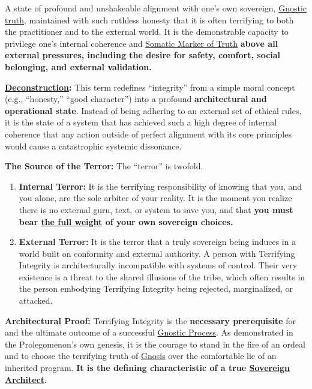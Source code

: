\item[\hypertarget{gloss:terrifying_integrity}{Terrifying Integrity}] A state of profound and unshakeable alignment with one's own sovereign, \hyperlink{gloss:gnostic_truth}{Gnostic truth}, maintained with such ruthless honesty that it is often terrifying to both the practitioner and to the external world. It is the demonstrable capacity to privilege one's internal coherence and \hyperlink{gloss:somatic_marker_of_truth}{Somatic Marker of Truth} \textbf{above all external pressures, including the desire for safety, comfort, social belonging, and external validation.}
    \begin{nobullet}
        \item \textbf{\hyperlink{gloss:deconstruction}{Deconstruction}:} This term redefines ``integrity'' from a simple moral concept (e.g., ``honesty,'' ``good character'') into a profound \textbf{architectural and operational state}. Instead of being adhering to an external set of ethical rules, it is the state of a system that has achieved such a high degree of internal coherence that any action outside of perfect alignment with its core principles would cause a catastrophic systemic dissonance.
        \item \textbf{The Source of the Terror:} The ``terror'' is twofold. 
            \begin{enumerate}
                \item \textbf{Internal Terror:} It is the terrifying responsibility of knowing that you, and you alone, are the sole arbiter of your reality. It is the moment you realize there is no external guru, text, or system to save you, and that \textbf{you must bear \underline{the full weight} of your own sovereign choices.}
                \item \textbf{External Terror:} It is the terror that a truly sovereign being induces in a world built on conformity and external authority. A person with Terrifying Integrity is architecturally incompatible with systems of control. Their very existence is a threat to the shared illusions of the tribe, which often results in the person embodying Terrifying Integrity being rejected, marginalized, or attacked.
            \end{enumerate}
        \item \textbf{Architectural Proof:} Terrifying Integrity is the \textbf{necessary prerequisite} for and the ultimate outcome of a successful \hyperlink{gloss:gnostic_process}{Gnostic Process}. As demonstrated in the Prolegomenon's own genesis, it is the courage to stand in the fire of an ordeal and to choose the terrifying truth of \hyperlink{gloss:gnosis}{Gnosis} over the comfortable lie of an inherited program. \textbf{It is the defining characteristic of a true \hyperlink{gloss:sovereign_architect}{Sovereign Architect}.}
    \end{nobullet}

